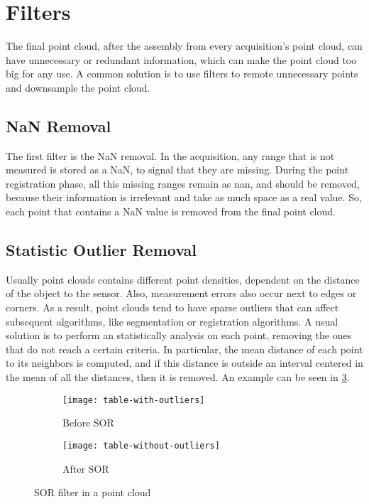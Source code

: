\section{Filters}
\label{section:filters}

The final point cloud, after the assembly from every acquisition's point cloud, can have unnecessary or redundant information, which can make the point cloud too big for any use. A common solution is to use filters to remote unnecessary points and downsample the point cloud.

\subsection{NaN Removal}

The first filter is the NaN removal. In the acquisition, any range that is not measured is stored as a NaN, to signal that they are missing. During the point registration phase, all this missing ranges remain as nan, and should be removed, because their information is irrelevant and take as much space as a real value. So, each point that contains a NaN value is removed from the final point cloud.

\subsection{Statistic Outlier Removal}

Usually point clouds contains different point densities, dependent on the distance of the object to the sensor. Also, measurement errors also occur next to edges or corners. As a result, point clouds tend to have sparse outliers that can affect subsequent algorithms, like segmentation or registration algorithms. A usual solution is to perform an statistically analysis on each point, removing the ones that do not reach a certain criteria. In particular, the mean distance of each point to its neighbors is computed, and if this distance is outside an interval centered in the mean of all the distances, then it is removed. An example can be seen in \cref{figure:sor-filter}.

\begin{figure}[h]
    
    \centering
    \begin{subfigure}[t]{0.5\textwidth}
        
        \centering
        \texttt{[image: table-with-outliers]}
        \caption{Before SOR}
        \label{figure:sor-filter-before}
    \end{subfigure}%
    \begin{subfigure}[t]{0.5\textwidth}
        \centering
        \texttt{[image: table-without-outliers]}
        \caption{After SOR}
        \label{figure:sor-filter-after}
    \end{subfigure}

    \caption{SOR filter in a point cloud}
    \label{figure:sor-filter}
\end{figure}

